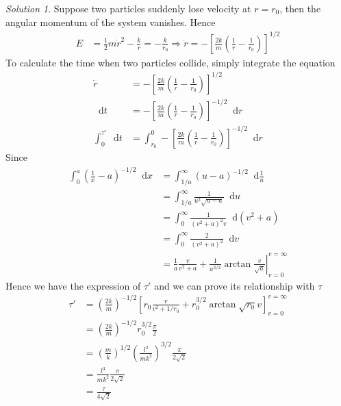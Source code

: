 \documentclass[twoside,11pt]{article}
\newcommand{\lms}{\fontfamily{lmss}\selectfont} %
\renewcommand*\d{\mathop{}\!\mathrm{d}}
\theoremstyle{definition}
\theoremstyle{remark}
\newtheorem*{solution}{\lms Solution}
\begin{document}
\begin{solution}
Suppose two particles suddenly lose velocity at $r=r_0$,
then the angular momentum of the system vanishes.
Hence
\begin{align*}
    E &= \frac{1}{2}m\dot{r}^2 - \frac{k}{r} = -\frac{k}{r_0}
    \Rightarrow
    \dot{r} = -\left[
        \frac{2k}{m}\left(
            \frac{1}{r} - \frac{1}{r_0}
        \right)
    \right]^{1/2}
\end{align*}
To calculate the time when two particles collide, simply integrate the equation
\begin{align*}
    \dot{r} &= -\left[
        \frac{2k}{m}\left(
            \frac{1}{r} - \frac{1}{r_0}
        \right)
    \right]^{1/2}\\
    \d t &=
    -\left[
        \frac{2k}{m}\left(
            \frac{1}{r} - \frac{1}{r_0}
        \right)
    \right]^{-1/2}\d r\\
    \int_0^{\tau'} \d t &= 
    \int_{r_0}^0 -\left[
        \frac{2k}{m}\left(
            \frac{1}{r} - \frac{1}{r_0}
        \right)
    \right]^{-1/2}\d r
\end{align*}
Since
\begin{align*}
    \int_0^a\left(\frac{1}{x} - a\right)^{-1/2}\d x  
    &= \int_{1/a}^\infty \left(u - a\right)^{-1/2}\d\frac{1}{u}\\
    &= \int_{1/a}^\infty\frac{1}{u^2\sqrt{u - a}}\d u\\
    &= \int_0^\infty\frac{1}{(v^2+a)^2 v}\d (v^2 + a)\\
    &= \int_0^\infty \frac{2}{(v^2+a)^2}\d v\\
    &= \left.\frac{1}{a}\frac{v}{v^2 + a} + \frac{1}{a^{3/2}}\arctan\frac{v}{\sqrt{a}}\right|_{v=0}^{v=\infty}
\end{align*}
Hence we have the expression of $\tau'$ and 
we can prove its relationship with $\tau$
\begin{align*}
    \tau' &= 
    \left(\frac{2k}{m}\right)^{-1/2}
    \left[
        r_0\frac{v}{v^2 + 1/r_0} + r_0^{3/2}\arctan\sqrt{r_0} v
    \right]_{v=0}^{v=\infty}\\
    &= 
    \left(\frac{2k}{m}\right)^{-1/2}
    r_0^{3/2}\frac{\pi}{2}\\
    &= \left(\frac{m}{k}\right)^{1/2}
    \left(\frac{l^2}{mk^2}\right)^{3/2}\frac{\pi}{2\sqrt{2}}\\
    &= \frac{l^3}{mk^2}\frac{\pi}{2\sqrt{2}}\\
    &= \frac{\tau}{4\sqrt{2}}
\end{align*}
\end{solution}
\end{document}

